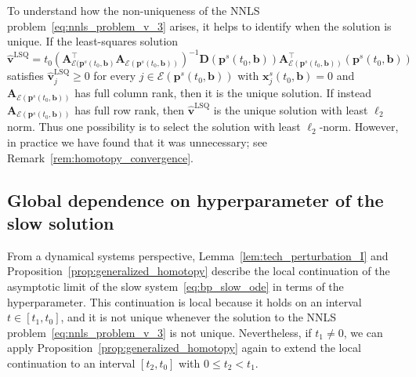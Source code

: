 \documentclass[11pt]{article}
\numberwithin{prop}{section}
\numberwithin{lem}{section}
\numberwithin{rem}{section}
\numberwithin{cor}{section}
\numberwithin{thm}{section}
\numberwithin{defn}{section}
\numberwithin{fact}{section}
\theoremstyle{plain}
\def\bb {\boldsymbol{b}}
\def\tzero {t_{0}}
\def\bp {\boldsymbol{p}}
\def\bv {\boldsymbol{v}}
\def\bx {\boldsymbol{x}}
\newcommand{\matr}[1]{\bm{#1}}
\def\eqset {\mathcal{E}}
\def\bvlsq {\hat{\bv}^{\text{LSQ}}}
\def\Atop {\matr{A}^{\top}}
\begin{document}
To understand how the non-uniqueness of the NNLS problem~\eqref{eq:nnls_problem_v_3} arises, it helps to identify when the solution is unique. If the least-squares solution 
\[
\bvlsq = \tzero(\Atop_{\eqset(\bp^{s}(\tzero,\bb)}\matr{A}_{\eqset(\bp^{s}(\tzero,\bb))})^{-1} \matr{D}(\bp^{s}(\tzero,\bb))\Atop_{\eqset(\bp^{s}(\tzero,\bb))}(\bp^{s}(\tzero,\bb))
\]
satisfies $\bvlsq_{j} \geqslant 0$ for every $j \in \eqset(\bp^{s}(\tzero,\bb))$ with $\bx_{j}^{s}(\tzero,\bb) = 0$ and $\matr{A}_{\eqset(\bp^{s}(\tzero,\bb))}$ has full column rank, then it is the unique solution. If instead $\matr{A}_{\eqset(\bp^{s}(\tzero,\bb))}$ has full row rank, then $\bvlsq$ is the unique solution with least $\ell_{2}$ norm. Thus one possibility is to select the solution with least $\ell_{2}$-norm. However, in practice we have found that it was unnecessary; see Remark~\ref{rem:homotopy_convergence}.






\subsection{Global dependence on hyperparameter of the slow solution}\label{subsec:generalized_homotopyII}
From a dynamical systems perspective, Lemma~\ref{lem:tech_perturbation_I} and Proposition~\ref{prop:generalized_homotopy} describe the local continuation of the asymptotic limit of the slow system~\eqref{eq:bp_slow_ode} in terms of the hyperparameter. This continuation is local because it holds on an interval $t \in [t_{1},\tzero]$, and it is not unique whenever the solution to the NNLS problem~\eqref{eq:nnls_problem_v_3} is not unique. Nevertheless, if $t_{1} \neq 0$, we can apply Proposition~\ref{prop:generalized_homotopy} again to extend the local continuation to an interval $[t_{2},\tzero]$ with $0 \leqslant t_{2} < t_{1}$.
\end{document}
